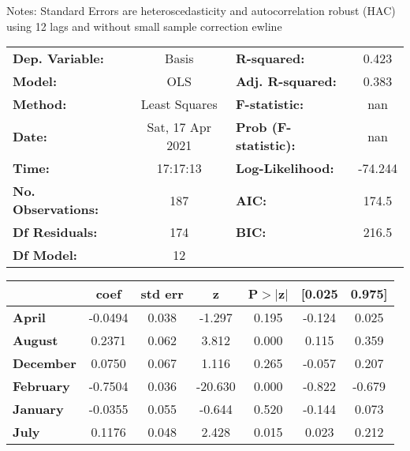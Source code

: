 Notes: \newline
 [1] Standard Errors are heteroscedasticity and autocorrelation robust (HAC) using 12 lags and without small sample correction
ewline\begin{center}
\begin{tabular}{lclc}
\toprule
\textbf{Dep. Variable:}    &      Basis       & \textbf{  R-squared:         } &     0.423   \\
\textbf{Model:}            &       OLS        & \textbf{  Adj. R-squared:    } &     0.383   \\
\textbf{Method:}           &  Least Squares   & \textbf{  F-statistic:       } &       nan   \\
\textbf{Date:}             & Sat, 17 Apr 2021 & \textbf{  Prob (F-statistic):} &      nan    \\
\textbf{Time:}             &     17:17:13     & \textbf{  Log-Likelihood:    } &   -74.244   \\
\textbf{No. Observations:} &         187      & \textbf{  AIC:               } &     174.5   \\
\textbf{Df Residuals:}     &         174      & \textbf{  BIC:               } &     216.5   \\
\textbf{Df Model:}         &          12      & \textbf{                     } &             \\
\bottomrule
\end{tabular}
\begin{tabular}{lcccccc}
                   & \textbf{coef} & \textbf{std err} & \textbf{z} & \textbf{P$> |$z$|$} & \textbf{[0.025} & \textbf{0.975]}  \\
\midrule
\textbf{April}     &      -0.0494  &        0.038     &    -1.297  &         0.195        &       -0.124    &        0.025     \\
\textbf{August}    &       0.2371  &        0.062     &     3.812  &         0.000        &        0.115    &        0.359     \\
\textbf{December}  &       0.0750  &        0.067     &     1.116  &         0.265        &       -0.057    &        0.207     \\
\textbf{February}  &      -0.7504  &        0.036     &   -20.630  &         0.000        &       -0.822    &       -0.679     \\
\textbf{January}   &      -0.0355  &        0.055     &    -0.644  &         0.520        &       -0.144    &        0.073     \\
\textbf{July}      &       0.1176  &        0.048     &     2.428  &         0.015        &        0.023    &        0.212     \\

\end{tabular}
\end{center}
